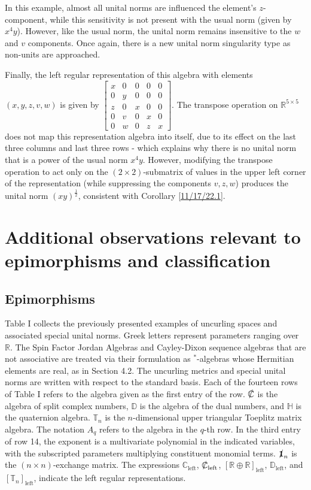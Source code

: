 \documentclass{amsart}
\numberwithin{equation}{section}
\theoremstyle{definition}
\numberwithin{theorem}{section}
\begin{document}
In this example, almost all unital norms are influenced the element's $z$-component, while this sensitivity is not present with the usual norm (given by $x^4y$).  However, like the usual norm,  the unital norm remains insensitive to the $w$ and $v$ components.  Once again, there is a new unital norm singularity type as non-units are approached.  

Finally, the left regular representation of this algebra with elements $(x,y,z,v,w)$ is given by $ \left[
\begin{array}{ccccc}
x & 0 & 0 & 0 & 0   \\
0 & y & 0 & 0 & 0 \\
z & 0 &  x & 0 & 0  \\
0 & v &  0 & x & 0  \\
0 & w &  0 & z & x
\end{array}
\right].$ 
The transpose operation on $\mathbb{R}^{5\times 5}$ does not map this representation algebra into itself, due to its effect on the last three columns and last three rows - which explains why there is no unital norm that is a power of the usual norm $x^4y$.  However, modifying the transpose operation to act only on the $(2\times 2)$-submatrix of values in the upper left corner of the representation (while suppressing the components $v,z,w$) produces the unital norm $(xy)^\frac{1}{2}$, consistent with Corollary \ref{11/17/22.1}.
 
\section{Additional observations relevant to epimorphisms and classification}
\subsection{Epimorphisms} Table I collects the previously presented examples of uncurling spaces and associated special unital norms.  Greek letters represent parameters ranging over $\mathbb{R}$.  The Spin Factor Jordan Algebras and Cayley-Dixon sequence algebras that are not associative are treated via their formulation as \mbox{$^*$-algebras} whose Hermitian elements are real, as in Section 4.2. The uncurling metrics and special unital norms are written with respect to the standard basis.  Each of the fourteen rows of Table I refers to the algebra given as the first entry of the row.  $\slashed{\mathbb{C}}$ is the algebra of split complex numbers, $\mathbb{D}$ is the algebra of the dual numbers, and $\mathbb{H}$ is the quaternion algebra.  $\mathbb{T}_n$ is the $n$-dimensional upper triangular Toeplitz matrix algebra.  The notation $A_q$ refers to the algebra in the $q$-th row.  In the third entry of row 14, the exponent is a multivariate polynomial in the indicated variables, with the subscripted parameters multiplying constituent monomial terms.  $\slashed{\mathbf{1}}_n$ is the $(n\times n)$-exchange matrix.  The expressions $\mathbb{C}_\text{left}$, $\slashed{\mathbb{C}}_\text{left}$, $[\mathbb{R}\oplus\mathbb{R}]_\text{left}$, $\mathbb{D}_\text{left}$, and $[\mathbb{T}_n]_\text{left}$, indicate the left regular representations.  
\end{document}
